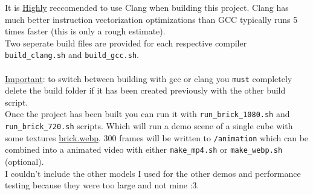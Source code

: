 \documentclass[12pt]{article}
\begin{document}
It is \underline{Highly} reccomended to use Clang when building this project. Clang has much better instruction vectorization optimizations than GCC typically runs 5 times faster (this is only a rough estimate). 
\\

Two seperate build files are provided for each respective compiler \texttt{build\_clang.sh} and \texttt{build\_gcc.sh}. \\
\\
\underline{Important}: to switch between building with gcc or clang you \texttt{must} completely delete the build folder if it has been created previously with the other build script.\\

Once the project has been built you can run it with \texttt{run\_brick\_1080.sh} and \texttt{run\_brick\_720.sh} scripts. Which will run a demo scene of a single cube with some textures \href{https://github.com/ParkerTenBroeck/3P93/blob/529db5749c074b050dfc25d55a320687e4204814/p2/code/examples/brick.webp}{brick.webp}. 300 frames will be written to \texttt{/animation} which can be combined into a animated video with either \texttt{make\_mp4.sh} or \texttt{make\_webp.sh} (optional). \\

I couldn't include the other models I used for the other demos and performance testing because they were too large and not mine :3.


\nocite{*}


\end{document}

